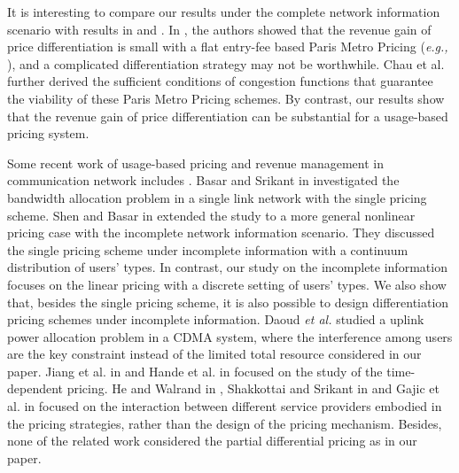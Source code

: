 \documentclass[twocolumn,10pt,twosided]{IEEEtran}
\newcommand{\eg}{\emph{e.g., }}
\begin{document}
It is interesting to compare our results under the complete network information scenario with results in \cite{shakkottai2008price} and \cite{chau2010viability}. In \cite{shakkottai2008price}, the authors showed that the revenue gain of price differentiation is small with a flat entry-fee based  Paris Metro Pricing (\eg \cite{odlyzko1999paris}), and a complicated differentiation strategy may not be worthwhile. Chau et al.\cite{chau2010viability} further derived the sufficient conditions of congestion functions that guarantee the viability of these Paris Metro Pricing schemes.
By contrast, our results show that the revenue gain of price differentiation can be substantial for a usage-based pricing system.


Some recent work of usage-based pricing and revenue management in communication network includes \cite{basar2002revenue, shen2007optimal, daoud2008stackelberg, jiang2008time, hande2010pricing, he2005pricing,shakkottai2006economics, voja}. Basar and Srikant in \cite{basar2002revenue} investigated the bandwidth allocation problem in a single link network with the single pricing scheme. Shen and Basar in \cite{shen2007optimal} extended the study to a more general nonlinear pricing case with the incomplete network information scenario. They discussed the single pricing scheme under incomplete information with a continuum distribution of users' types. In contrast, our study on the incomplete information focuses on the linear pricing with a discrete setting of users' types. We also show that, besides the single pricing scheme, it is also possible to design differentiation pricing schemes under incomplete information. Daoud \emph{et al.}  \cite{daoud2008stackelberg} studied a uplink power allocation problem in a CDMA system, where the interference among users are the key constraint instead of the limited total resource considered in our paper.
Jiang et al. in \cite{jiang2008time} and Hande et al. in \cite{hande2010pricing}  focused on the study of the time-dependent pricing. He and Walrand in  \cite{he2005pricing},  Shakkottai and Srikant in \cite{shakkottai2006economics} and Gajic et al. in \cite{voja} focused on the interaction between different service providers embodied in the pricing strategies, rather than the design of the pricing mechanism. Besides, none of the related work considered the partial differential pricing as in our paper.
\end{document}
